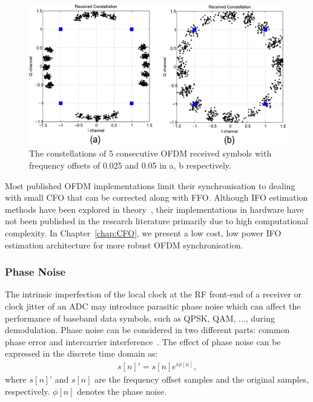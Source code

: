 \begin{figure}
	\centerline{\includegraphics [width=0.8\columnwidth] {Figures/freoff_5sym.pdf} }
	\caption{The constellations of 5 consecutive OFDM received symbols with frequency offsets of 0.025 and 0.05 in a, b respectively.}
	\label{fig:freoff_5sym}
\end{figure}

Most published OFDM implementations limit their synchronisation to dealing with small CFO that can be corrected along with FFO.
Although IFO estimation methods have been explored in theory~\cite{Shim2006,Morelli2008,You2010,Lee2013,Morelli2014}, their implementations in hardware have not been published in the research literature primarily due to high computational complexity. In Chapter~\ref{chap:CFO}, we present a low cost, low power IFO estimation architecture for more robust OFDM synchronisation.

\subsubsection{Phase Noise}

The intrinsic imperfection of the local clock at the RF front-end of a receiver or clock jitter of an ADC may introduce parasitic phase noise which can affect the performance of baseband data symbols, such as QPSK, QAM, ..., during demodulation.
Phase noise can be considered in two different parts: common phase error and intercarrier interference~\cite{Armada1998}. The effect of phase noise can be expressed in the discrete time domain as:
\begin{eqnarray}
\label{equ:}
            s[n]' = s[n] e^{i\phi[n]},
\end{eqnarray}
where $s[n]$' and $s[n]$ are the frequency offset samples and the original samples, respectively.
$\phi[n]$ denotes the phase noise.

